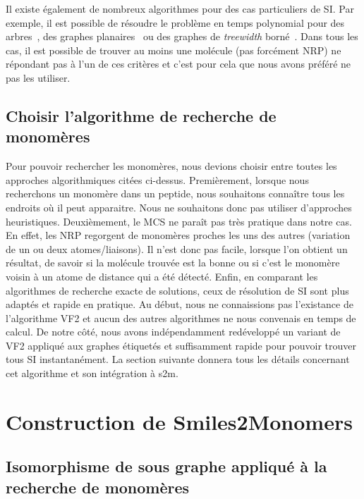 Il existe également de nombreux algorithmes pour des cas particuliers de SI.
Par exemple, il est possible de résoudre le problème en temps polynomial pour des arbres~\cite{shamir_faster_1997}, des graphes planaires~\cite{eppstein_subgraph_1995,dorn_planar_2009} ou des graphes de \textit{treewidth} borné~\cite{hajiaghayi_subgraph_2007}.
Dans tous les cas, il est possible de trouver au moins une molécule (pas forcément NRP) ne répondant pas à l'un de ces critères et c'est pour cela que nous avons préféré ne pas les utiliser.


\subsection{Choisir l'algorithme de recherche de monomères}

Pour pouvoir rechercher les monomères, nous devions choisir entre toutes les approches algorithmiques citées ci-dessus.
Premièrement, lorsque nous recherchons un monomère dans un peptide, nous souhaitons connaître tous les endroits où il peut apparaitre.
Nous ne souhaitons donc pas utiliser d'approches heuristiques.
Deuxièmement, le MCS ne paraît pas très pratique dans notre cas.
En effet, les NRP regorgent de monomères proches les uns des autres (variation de un ou deux atomes/liaisons).
Il n'est donc pas facile, lorsque l'on obtient un résultat, de savoir si la molécule trouvée est la bonne ou si c'est le monomère voisin à un atome de distance qui a été détecté.
Enfin, en comparant les algorithmes de recherche exacte de solutions, ceux de résolution de SI sont plus adaptés et rapide en pratique.
Au début, nous ne connaissions pas l'existance de l'algorithme VF2 et aucun des autres algorithmes ne nous convenais en temps de calcul.
De notre côté, nous avons indépendamment redéveloppé un variant de VF2 appliqué aux graphes étiquetés et suffisamment rapide pour pouvoir trouver tous SI instantanément.
La section suivante donnera tous les détails concernant cet algorithme et son intégration à s2m.




\section{Construction de Smiles2Monomers}

\subsection{Isomorphisme de sous graphe appliqué à la recherche de monomères}

